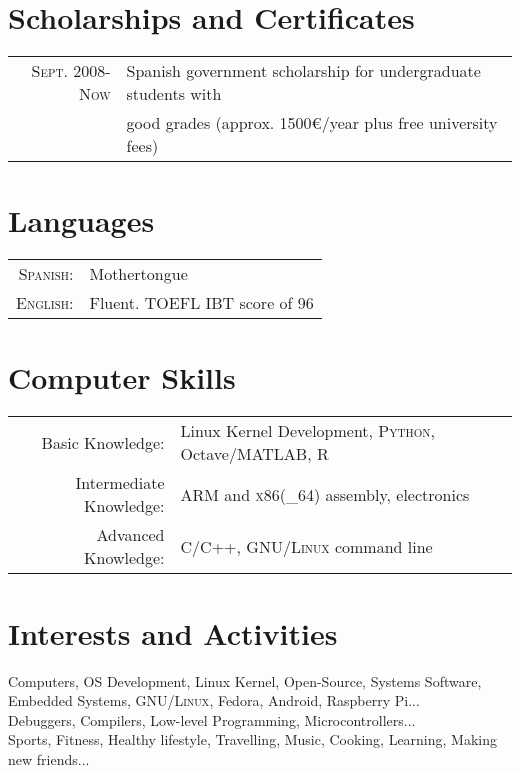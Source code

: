 \documentclass[a4paper,10pt]{article}
\begin{document}
\section{Scholarships and Certificates}
\begin{tabular}{rl}
 \textsc{Sept.} 2008-\textsc{Now} & Spanish government scholarship for undergraduate students with \\&good grades \footnotesize (approx. 1500€/year plus free university fees)
\end{tabular}

\section{Languages}
\begin{tabular}{rl}
 \textsc{Spanish:}&Mothertongue\\
\textsc{English:}&Fluent. TOEFL IBT score of 96\\
\end{tabular}

\section{Computer Skills}
\begin{tabular}{rl}
Basic Knowledge:& Linux Kernel Development, \textsc{Python}, Octave/MATLAB,
\textsc{R}\\
Intermediate Knowledge:& \textsc{ARM} and \textsc{x86(\_64)} assembly, electronics\\
Advanced Knowledge:& \textsc{C/C++}, \textsc{GNU/Linux} command line\\
\end{tabular}

\section{Interests and Activities}
Computers, OS Development, Linux Kernel, Open-Source, Systems Software,
Embedded Systems, \textsc{GNU/Linux}, Fedora, Android, Raspberry Pi... \\
Debuggers, Compilers, Low-level Programming, Microcontrollers...\\
Sports, Fitness, Healthy lifestyle, Travelling, Music, Cooking, Learning, Making new friends...
\end{document}
